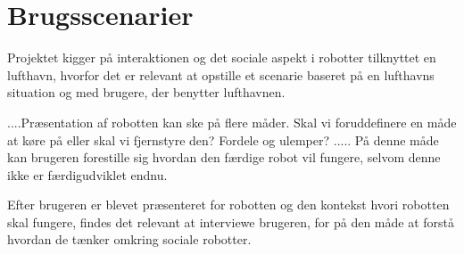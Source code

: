 \section{Brugsscenarier}
\label{ParametreBrugsscenarier}
%
Projektet kigger på interaktionen og det sociale aspekt i robotter tilknyttet en lufthavn, hvorfor det er relevant at opstille et scenarie baseret på en lufthavns situation og med brugere, der benytter lufthavnen.\blankline


....Præsentation af robotten kan ske på flere måder. Skal vi foruddefinere en måde at køre på eller skal vi fjernstyre den? Fordele og ulemper? ..... På denne måde kan brugeren forestille sig hvordan den færdige robot vil fungere, selvom denne ikke er færdigudviklet endnu.\blankline


Efter brugeren er blevet præsenteret for robotten og den kontekst hvori robotten skal fungere, findes det relevant at interviewe brugeren, for på den måde at forstå hvordan de tænker omkring sociale robotter.